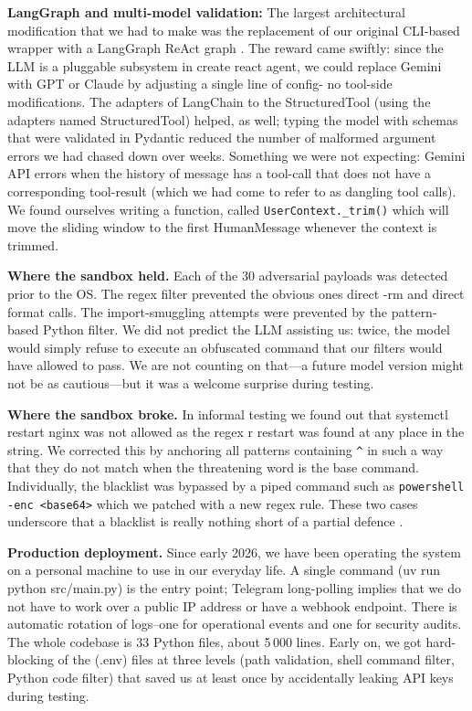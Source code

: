 \documentclass[conference]{IEEEtran}
\begin{document}
\textbf{LangGraph and multi-model validation:}
The largest architectural modification that we had to make was the replacement of our original CLI-based wrapper with a LangGraph ReAct graph \cite{langgraph2024}. The reward came swiftly: since the LLM is a pluggable subsystem in create react agent, we could replace Gemini with GPT or Claude by adjusting a single line of config- no tool-side modifications. The adapters of LangChain to the StructuredTool (using the adapters named StructuredTool) helped, as well; typing the model with schemas that were validated in Pydantic reduced the number of malformed argument errors we had chased down over weeks. Something we were not expecting: Gemini API errors when the history of message has a tool-call that does not have a corresponding tool-result (which we had come to refer to as dangling tool calls). We found ourselves writing a function, called \texttt{UserContext.\_trim()} which will move the sliding window to the first HumanMessage whenever the context is trimmed.

\textbf{Where the sandbox held.}
Each of the 30 adversarial payloads was detected prior to the OS. The regex filter prevented the obvious ones direct -rm and direct format calls. The import-smuggling attempts were prevented by the pattern-based Python filter. We did not predict the LLM assisting us: twice, the model would simply refuse to execute an obfuscated command that our filters would have allowed to pass. We are not counting on that---a future model version might not be as cautious---but it was a welcome surprise during testing.

\textbf{Where the sandbox broke.}
In informal testing we found out that systemctl restart nginx was not allowed as the regex r restart was found at any place in the string. We corrected this by anchoring all patterns containing \texttt{\^{}} in such a way that they do not match when the threatening word is the base command. Individually, the blacklist was bypassed by a piped command such as \texttt{powershell -enc <base64>} which we patched with a new regex rule. These two cases underscore that a blacklist is really nothing short of a partial defence \cite{liu2023houyi, greshake2023indirect}.

\textbf{Production deployment.}
Since early 2026, we have been operating the system on a personal machine to use in our everyday life. A single command (uv run python src/main.py) is the entry point; Telegram long-polling implies that we do not have to work over a public IP address or have a webhook endpoint. There is automatic rotation of logs--one for operational events and one for security audits. The whole codebase is 33 Python files, about 5\,000 lines. Early on, we got hard-blocking of the (.env) files at three levels (path validation, shell command filter, Python code filter) that saved us at least once by accidentally leaking API keys during testing.
\end{document}
